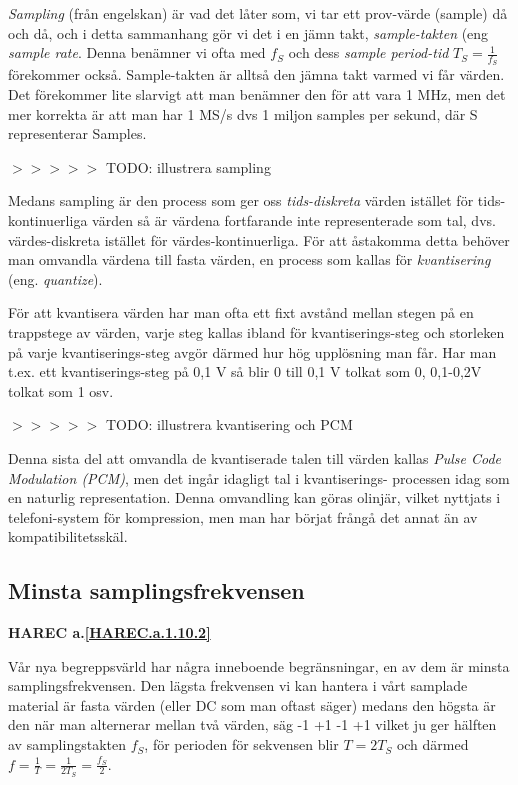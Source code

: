 \emph{Sampling} (från engelskan) är vad det låter som, vi tar ett prov-värde
(sample) då och då, och i detta sammanhang gör vi det i en jämn takt,
\emph{sample-takten} (eng \emph{sample rate}. Denna benämner vi ofta med
\(f_S\) och dess \emph{sample period-tid} \(T_S=\frac{1}{f_S}\) förekommer
också. Sample-takten är alltså den jämna takt varmed vi får värden. Det
förekommer lite slarvigt att man benämner den för att vara 1 MHz, men det mer
korrekta är att man har 1 MS/s dvs 1 miljon samples per sekund, där S
representerar Samples.

$>>>>>$ TODO: illustrera sampling

Medans sampling är den process som ger oss \emph{tids-diskreta} värden istället
för tids-kontinuerliga värden så är värdena fortfarande inte representerade som
tal, dvs. värdes-diskreta istället för värdes-kontinuerliga. För att åstakomma
detta behöver man omvandla värdena till fasta värden, en process som kallas för
\emph{kvantisering} (eng. \emph{quantize}).

För att kvantisera värden har man ofta ett fixt avstånd mellan stegen på en
trappstege av värden, varje steg kallas ibland för kvantiserings-steg och
storleken på varje kvantiserings-steg avgör därmed hur hög upplösning man får.
Har man t.ex. ett kvantiserings-steg på 0,1 V så blir 0 till 0,1 V tolkat som
0, 0,1-0,2V tolkat som 1 osv.

$>>>>>$ TODO: illustrera kvantisering och PCM

Denna sista del att omvandla de kvantiserade talen till värden kallas
\emph{Pulse Code Modulation (PCM)}, men det ingår idagligt tal i kvantiserings-
processen idag som en naturlig representation. Denna omvandling kan göras
olinjär, vilket nyttjats i telefoni-system för kompression, men man har börjat
frångå det annat än av kompatibilitetsskäl.

\subsection{Minsta samplingsfrekvensen}
\textbf{HAREC a.\ref{HAREC.a.1.10.2}\label{myHAREC.a.1.10.2}}

Vår nya begreppsvärld har några inneboende begränsningar, en av dem är minsta
samplingsfrekvensen. Den lägsta frekvensen vi kan hantera i vårt samplade
material är fasta värden (eller DC som man oftast säger) medans den högsta är
den när man alternerar mellan två värden, säg -1 +1 -1 +1 vilket ju ger
hälften av samplingstakten \(f_S\), för perioden för sekvensen blir
\(T = 2T_S\) och därmed \(f=\frac{1}{T}=\frac{1}{2T_S}=\frac{f_S}{2}\).


